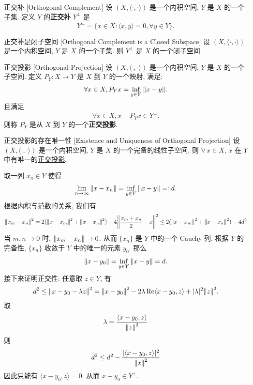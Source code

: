         \begin{dfn}
            {正交补}
            [Orthogonal Complement]
            设 \((X, \langle\cdot,\cdot\rangle)\) 是一个内积空间, \(Y\) 是 \(X\) 的一个子集. 定义 \(Y\) 的\textbf{正交补} \(Y^\perp\) 是
            \[Y^\perp=\{x\in X: \langle x,y\rangle=0, \forall y\in Y\}.\]
        \end{dfn}

        \begin{ppt}
            {正交补是闭子空间}
            [Orthogonal Complement is a Closed Subspace]
            设 \((X, \langle\cdot,\cdot\rangle)\) 是一个内积空间, \(Y\) 是 \(X\) 的一个子集. 则 \(Y^\perp\) 是 \(X\) 的一个闭子空间.
        \end{ppt}

        \begin{dfn}
            {正交投影}
            [Orthogonal Projection]
            设 \((X, \langle\cdot,\cdot\rangle)\) 是一个内积空间, \(Y\) 是 \(X\) 的一个子空间. 定义 \(P_Y:X\to Y\) 是 \(X\) 到 \(Y\) 的一个映射, 满足: 
            \[\forall x\in X, P_Y x=\inf_{y\in Y} \norm{x-y}.\]
            且满足
            \[\forall x\in X, x-P_Y x\in Y^\perp.\]
            则称 \(P_Y\) 是从 \(X\) 到 \(Y\) 的一个\textbf{正交投影}.
        \end{dfn}

        \begin{thm}
            {正交投影的存在唯一性}
            [Existence and Uniqueness of Orthogonal Projection]
            设 \((X, \langle\cdot,\cdot\rangle)\) 是一个内积空间, \(Y\) 是 \(X\) 的一个完备的线性子空间. 则 \(\forall\,x\in X\), \(x\) 在 \(Y\) 中有唯一的\hyperref[dfn:orthogonal-projection]{正交投影}.
        \end{thm}

        \begin{prf}
            取一列 \(x_n\in Y\) 使得
            \[\lim_{n\to\infty}\norm{x-x_n}=\inf_{y\in Y} \norm{x-y}=:d.\]
            根据内积与范数的关系, 我们有
            \[\norm{x_m-x_n}^2=2(\norm{x-x_m}^2+\norm{x-x_n}^2)-4\norm{\frac{x_m+x_n}{2}-x}^2\leq 2(\norm{x-x_m}^2+\norm{x-x_n}^2)-4d^2 \]
            当 \(m,n\to 0\) 时, \(\norm{x_m-x_n}\to 0\). 从而 \(\{x_n\}\) 是 \(Y\) 中的一个 Cauchy 列. 根据 \(Y\) 的完备性, \(\{x_n\}\) 收敛于 \(Y\) 中的唯一的元素 \(y_0\). 那么
            \[\norm{x-y_0}=\inf_{y\in Y} \norm{x-y}=d.\]
            接下来证明正交性: 任意取 \(z\in Y\), 有
            \[d^2\leq\norm{x-y_0-\lambda z}^2=\norm{x-y_0}^2-2\lambda\Re\langle x-y_0, z\rangle+|\lambda|^2\norm{z}^2.\]
            取
            \[\lambda=\frac{\langle x-y_0, z\rangle}{\norm{z}^2}\]
            则
            \[d^2\leq d^2-\frac{|\langle x-y_0, z\rangle|^2}{\norm{z}^2}\]
            因此只能有 \(\langle x-y_0, z\rangle=0\). 从而 \(x-y_0\in Y^\perp\).
        \end{prf}

